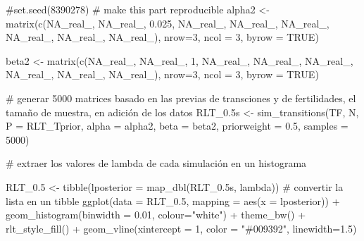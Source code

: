 \documentclass[
  12pt,
  letterpaper,
]{book}
\newenvironment{Shaded}{\begin{snugshade}}{\end{snugshade}}
\newcommand{\AttributeTok}[1]{\textcolor[rgb]{0.40,0.45,0.13}{#1}}
\newcommand{\CommentTok}[1]{\textcolor[rgb]{0.37,0.37,0.37}{#1}}
\newcommand{\ConstantTok}[1]{\textcolor[rgb]{0.56,0.35,0.01}{#1}}
\newcommand{\DecValTok}[1]{\textcolor[rgb]{0.68,0.00,0.00}{#1}}
\newcommand{\FloatTok}[1]{\textcolor[rgb]{0.68,0.00,0.00}{#1}}
\newcommand{\FunctionTok}[1]{\textcolor[rgb]{0.28,0.35,0.67}{#1}}
\newcommand{\NormalTok}[1]{\textcolor[rgb]{0.00,0.23,0.31}{#1}}
\newcommand{\OtherTok}[1]{\textcolor[rgb]{0.00,0.23,0.31}{#1}}
\newcommand{\SpecialCharTok}[1]{\textcolor[rgb]{0.37,0.37,0.37}{#1}}
\newcommand{\StringTok}[1]{\textcolor[rgb]{0.13,0.47,0.30}{#1}}
\begin{document}
\begin{Shaded}
\begin{Highlighting}[]
\CommentTok{\#set.seed(8390278) \# make this part reproducible}
\NormalTok{alpha2 }\OtherTok{\textless{}{-}} \FunctionTok{matrix}\NormalTok{(}\FunctionTok{c}\NormalTok{(}\ConstantTok{NA\_real\_}\NormalTok{, }\ConstantTok{NA\_real\_}\NormalTok{, }\FloatTok{0.025}\NormalTok{,}
                   \ConstantTok{NA\_real\_}\NormalTok{, }\ConstantTok{NA\_real\_}\NormalTok{, }\ConstantTok{NA\_real\_}\NormalTok{,}
                   \ConstantTok{NA\_real\_}\NormalTok{, }\ConstantTok{NA\_real\_}\NormalTok{, }\ConstantTok{NA\_real\_}\NormalTok{), }\AttributeTok{nrow=}\DecValTok{3}\NormalTok{, }\AttributeTok{ncol =} \DecValTok{3}\NormalTok{, }\AttributeTok{byrow =} \ConstantTok{TRUE}\NormalTok{)}

\NormalTok{beta2 }\OtherTok{\textless{}{-}} \FunctionTok{matrix}\NormalTok{(}\FunctionTok{c}\NormalTok{(}\ConstantTok{NA\_real\_}\NormalTok{, }\ConstantTok{NA\_real\_}\NormalTok{, }\DecValTok{1}\NormalTok{,}
                  \ConstantTok{NA\_real\_}\NormalTok{, }\ConstantTok{NA\_real\_}\NormalTok{, }\ConstantTok{NA\_real\_}\NormalTok{,}
                  \ConstantTok{NA\_real\_}\NormalTok{, }\ConstantTok{NA\_real\_}\NormalTok{, }\ConstantTok{NA\_real\_}\NormalTok{), }\AttributeTok{nrow=}\DecValTok{3}\NormalTok{, }\AttributeTok{ncol =} \DecValTok{3}\NormalTok{, }\AttributeTok{byrow =} \ConstantTok{TRUE}\NormalTok{)}

\CommentTok{\# generar 5000 matrices basado en las previas de transciones y de fertilidades, el tamaño de muestra, en adición de los datos}
\NormalTok{RLT\_0}\FloatTok{.5}\NormalTok{s }\OtherTok{\textless{}{-}} \FunctionTok{sim\_transitions}\NormalTok{(TF, N, }\AttributeTok{P =}\NormalTok{ RLT\_Tprior, }\AttributeTok{alpha =}\NormalTok{ alpha2, }\AttributeTok{beta =}\NormalTok{ beta2,}
                \AttributeTok{priorweight =} \FloatTok{0.5}\NormalTok{, }\AttributeTok{samples =} \DecValTok{5000}\NormalTok{)}


\CommentTok{\# extraer los valores de lambda de cada simulación en un histograma}

\NormalTok{RLT\_0}\FloatTok{.5} \OtherTok{\textless{}{-}} \FunctionTok{tibble}\NormalTok{(}\AttributeTok{lposterior =} \FunctionTok{map\_dbl}\NormalTok{(RLT\_0}\FloatTok{.5}\NormalTok{s, lambda)) }\CommentTok{\# convertir la lista en un tibble}
\FunctionTok{ggplot}\NormalTok{(}\AttributeTok{data =}\NormalTok{ RLT\_0}\FloatTok{.5}\NormalTok{,}
       \AttributeTok{mapping =} \FunctionTok{aes}\NormalTok{(}\AttributeTok{x =}\NormalTok{ lposterior)) }\SpecialCharTok{+} 
  \FunctionTok{geom\_histogram}\NormalTok{(}\AttributeTok{binwidth =} \FloatTok{0.01}\NormalTok{, }\AttributeTok{colour=}\StringTok{"white"}\NormalTok{) }\SpecialCharTok{+} 
  \FunctionTok{theme\_bw}\NormalTok{() }\SpecialCharTok{+}
  \FunctionTok{rlt\_style\_fill}\NormalTok{() }\SpecialCharTok{+}
  \FunctionTok{geom\_vline}\NormalTok{(}\AttributeTok{xintercept =} \DecValTok{1}\NormalTok{, }
                \AttributeTok{color =} \StringTok{"\#009392"}\NormalTok{, }\AttributeTok{linewidth=}\FloatTok{1.5}\NormalTok{)}
\end{Highlighting}
\end{Shaded}
\end{document}
